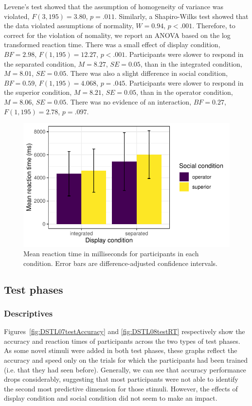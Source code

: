 \documentclass[doc, a4paper, apacite]{apa6}
\begin{document}
Levene's test showed that the assumption of homogeneity of variance was violated, $F(3, 195)=3.80$, $p=.011$. 
Similarly, a Shapiro-Wilks test showed that the data violated assumptions of normality, $W=0.94$, $p<.001$. 
Therefore, to correct for the violation of nomality, we report an ANOVA based on the log transformed reaction time. 
There was a small effect of display condition, $BF=2.98$, $F(1, 195)=12.27$, $p<.001$.
Participants were slower to respond in the separated condition, $M=8.27$, $SE=0.05$, than in the integrated condition, $M=8.01$, $SE=0.05$. 
There was also a slight difference in social condition, $BF=0.59$, $F(1, 195)=4.068$, $p=.045$. 
Participants were slower to respond in the superior condition, $M=8.21$, $SE=0.05$, than in the operator condition, $M=8.06$, $SE=0.05$. 
There was no evidence of an interaction, $BF=0.27$, $F(1, 195)=2.78$, $p=.097$. 

\begin{figure}
	\centering
	\includegraphics{images/DSTL07learningRT}
	\caption{Mean reaction time in milliseconds for participants in each condition. Error bars are difference-adjusted confidence intervals.}
	\label{fig:DSTL07learningRT}
\end{figure}

\subsection{Test phases}

\subsubsection{Descriptives}
Figures~\ref{fig:DSTL07testAccuracy} and \ref{fig:DSTL08testRT} respectively show the accuracy and reaction times of participants across the two types of test phases.
As some novel stimuli were added in both test phases, these graphs reflect the accuracy and speed only on the trials for which the participants had been trained (i.e. that they had seen before). 
Generally, we can see that accuracy performance drops considerably, suggesting that most participants were not able to identify the second most predictive dimension for those stimuli. 
However, the effects of display condition and social condition did not seem to make an impact. 
\end{document}
